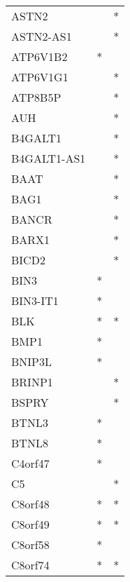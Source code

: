 \begin{longtable}{lcc}
ASTN2                 &                &          * \\
ASTN2-AS1             &                &          * \\
ATP6V1B2              &              * &            \\
ATP6V1G1              &                &          * \\
ATP8B5P               &                &          * \\
AUH                   &                &          * \\
B4GALT1               &                &          * \\
B4GALT1-AS1           &                &          * \\
BAAT                  &                &          * \\
BAG1                  &                &          * \\
BANCR                 &                &          * \\
BARX1                 &                &          * \\
BICD2                 &                &          * \\
BIN3                  &              * &            \\
BIN3-IT1              &              * &            \\
BLK                   &              * &          * \\
BMP1                  &              * &            \\
BNIP3L                &              * &            \\
BRINP1                &                &          * \\
BSPRY                 &                &          * \\
BTNL3                 &              * &            \\
BTNL8                 &              * &            \\
C4orf47               &              * &            \\
C5                    &                &          * \\
C8orf48               &              * &          * \\
C8orf49               &              * &          * \\
C8orf58               &              * &            \\
C8orf74               &              * &          * \\

\end{longtable}
